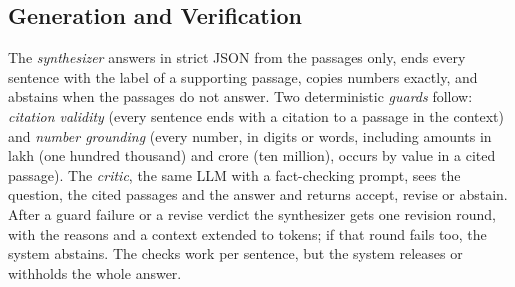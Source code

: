 \subsection{Generation and Verification}
The \emph{synthesizer} answers in strict JSON from the passages only, ends every sentence with the label of a supporting passage, copies numbers exactly, and abstains when the passages do not answer.
Two deterministic \emph{guards} follow: \emph{citation validity} (every sentence ends with a citation to a passage in the context) and \emph{number grounding} (every number, in digits or words, including amounts in lakh (one hundred thousand) and crore (ten million), occurs by value in a cited passage).
The \emph{critic}, the same LLM with a fact-checking prompt, sees the question, the cited passages and the answer and returns accept, revise or abstain.
After a guard failure or a revise verdict the synthesizer gets one revision round, with the reasons and a context extended to  tokens; if that round fails too, the system abstains.
The checks work per sentence, but the system releases or withholds the whole answer.
